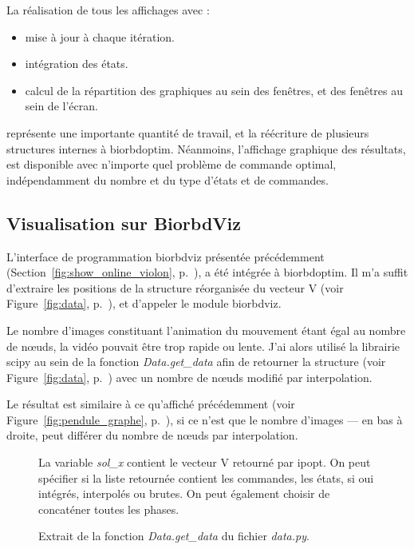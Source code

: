 La réalisation de tous les affichages avec :
\begin{itemize}
\setlength\parskip{-0.5em}
\item mise à jour à chaque itération.
\item intégration des états.
\item calcul de la répartition des graphiques au sein des fenêtres, et des fenêtres au sein de l'écran.
\end{itemize}
représente une importante quantité de travail, et la réécriture de plusieurs structures internes à \gls{biorbdoptim}. Néanmoins, l'affichage graphique des résultats, est disponible avec n'importe quel problème de commande optimal, indépendamment du nombre et du type d'états et de commandes. 

            \subsection{Visualisation sur BiorbdViz}
        
L'interface de programmation \gls{biorbdviz} présentée précédemment (Section~\ref{fig:show_online_violon}, p.~\pageref{fig:show_online_violon}), a été intégrée à \gls{biorbdoptim}. Il m'a suffit d'extraire les positions de la structure réorganisée du vecteur V (voir Figure~\ref{fig:data}, p.~\pageref{fig:data}), et d'appeler le module \gls{biorbdviz}.

Le nombre d'images constituant l'animation du mouvement étant égal au nombre de nœuds, la vidéo pouvait être trop rapide ou lente. J'ai alors utilisé la librairie \gls{scipy} au sein de la fonction \emph{Data.get\_data} afin de retourner la structure (voir Figure~\ref{fig:data}, p.~\pageref{fig:data}) avec un nombre de nœuds modifié par interpolation.

Le résultat est similaire à ce qu'affiché précédemment (voir Figure~\ref{fig:pendule_graphe}, p.~\pageref{fig:pendule_graphe}), si ce n'est que le nombre d'images --- en bas à droite, peut différer du nombre de nœuds par interpolation.


\begin{center}
\setlength\itemsep{-0.5em}

\vspace{-0.6cm}
\begin{figure}[h]
\caption{Extrait de la fonction \emph{Data.get\_data} du fichier \emph{data.py}.}
La variable \emph{sol\_x} contient le vecteur V retourné par \gls{ipopt}. On peut spécifier si la liste retournée contient les commandes,  les états, si oui intégrés, interpolés ou brutes. On peut également choisir de concaténer toutes les phases.
\label{fig:getdata}
\end{figure}
\end{center}

